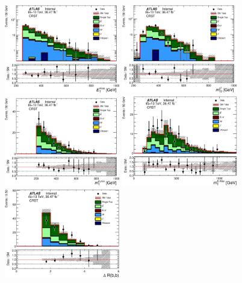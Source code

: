\begin{figure}[htbp]
\begin{center}
\includegraphics[width=0.45\textwidth]{figures/singleTop/postfit/Met_CRST_log.eps}
\includegraphics[width=0.45\textwidth]{figures/singleTop/postfit/MT2Chi2_CRST_log.eps}
\includegraphics[width=0.45\textwidth]{figures/singleTop/postfit/MtBMin_CRST.eps}
\includegraphics[width=0.45\textwidth]{figures/singleTop/postfit/MtBMax_CRST.eps}
\includegraphics[width=0.45\textwidth]{figures/singleTop/postfit/DRBB_CRST.eps}

\end{center}
\end{figure}
